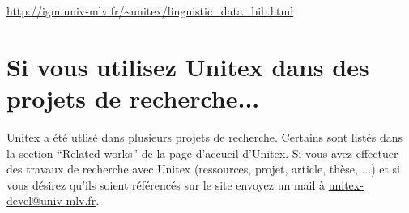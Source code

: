 \bigskip
\noindent \url{http://igm.univ-mlv.fr/~unitex/linguistic_data_bib.html}


\section*{Si vous utilisez Unitex dans des projets de recherche...}
Unitex a été utlisé dans plusieurs projets de recherche. Certains sont listés dans la section 
``Related works'' de la page d'accueil d'Unitex. Si vous avez effectuer des travaux de recherche
avec Unitex (ressources, projet, article, thèse, ...) et si vous désirez qu'ils soient référencés
sur le site envoyez un mail à \url{unitex-devel@univ-mlv.fr}.

